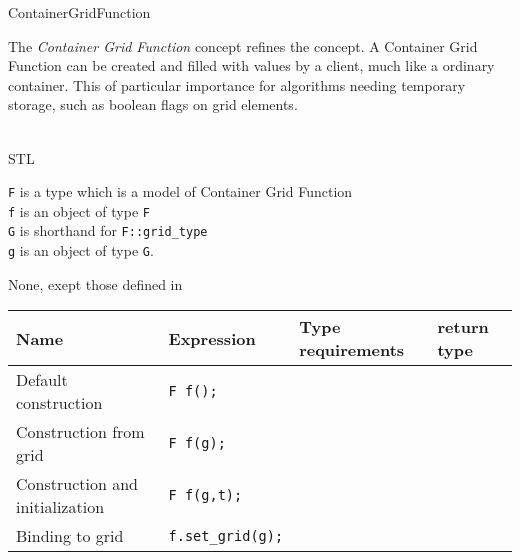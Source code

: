 \begin{Label}{ContainerGridFunction}
\end{Label}


The  {\em Container Grid Function\/} concept refines the 
 concept.
A Container Grid Function can be created and filled with values by a client,
much like a ordinary container. This of particular importance for 
algorithms needing temporary storage, such as boolean flags on grid elements.

\\
STL 

{\tt F} is a type which is a model of  Container Grid  Function 
\\
{\tt f} is an object of type  {\tt F}
\\
{\tt G} is shorthand for  {\tt F::grid\_type}
\\
{\tt g} is an object of type  {\tt G}.

None, exept those defined in

\begin{tabular}{llll} 
  \hline
  \bf  Name  &\bf  Expression  &\bf  Type requirements  & \bf  return type  \\ \hline
  Default construction & 
  {\tt F f();} &
  ~ &
  ~ 
  \\ 
  Construction from grid & 
  {\tt F f(g);} &
  ~ &
  ~ 
  \\ 
  Construction and initialization & 
  {\tt F f(g,t);} &
  ~ &
  ~ 
  \\ 
  Binding to grid &
  {\tt f.set\_grid(g);} &
  ~ &
  ~ 
  \\ 
  \hline
\end{tabular}

